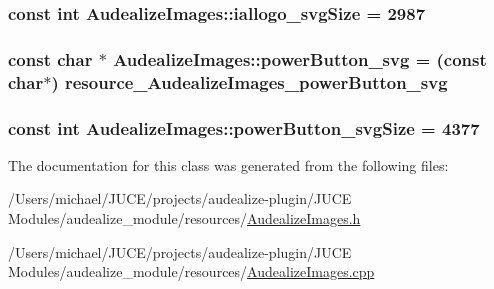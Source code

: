 \subsubsection[{\texorpdfstring{iallogo\+\_\+svg\+Size}{iallogo_svgSize}}]{\setlength{\rightskip}{0pt plus 5cm}const {\bf int} Audealize\+Images\+::iallogo\+\_\+svg\+Size = 2987\hspace{0.3cm}{\ttfamily [static]}}\hypertarget{class_audealize_1_1_audealize_images_a3216060c18fed8e493a28e3f39a020a1}{}\label{class_audealize_1_1_audealize_images_a3216060c18fed8e493a28e3f39a020a1}
\subsubsection[{\texorpdfstring{power\+Button\+\_\+svg}{powerButton_svg}}]{\setlength{\rightskip}{0pt plus 5cm}const char $\ast$ Audealize\+Images\+::power\+Button\+\_\+svg = (const char$\ast$) resource\+\_\+\+Audealize\+Images\+\_\+power\+Button\+\_\+svg\hspace{0.3cm}{\ttfamily [static]}}\hypertarget{class_audealize_1_1_audealize_images_a603300f72b88442487d1862ecc025337}{}\label{class_audealize_1_1_audealize_images_a603300f72b88442487d1862ecc025337}
\subsubsection[{\texorpdfstring{power\+Button\+\_\+svg\+Size}{powerButton_svgSize}}]{\setlength{\rightskip}{0pt plus 5cm}const {\bf int} Audealize\+Images\+::power\+Button\+\_\+svg\+Size = 4377\hspace{0.3cm}{\ttfamily [static]}}\hypertarget{class_audealize_1_1_audealize_images_afb26f9d7d3a8496bb571eea5b5de1077}{}\label{class_audealize_1_1_audealize_images_afb26f9d7d3a8496bb571eea5b5de1077}


The documentation for this class was generated from the following files\+:\begin{DoxyCompactItemize}
\item 
/\+Users/michael/\+J\+U\+C\+E/projects/audealize-\/plugin/\+J\+U\+C\+E Modules/audealize\+\_\+module/resources/\hyperlink{_audealize_images_8h}{Audealize\+Images.\+h}\item 
/\+Users/michael/\+J\+U\+C\+E/projects/audealize-\/plugin/\+J\+U\+C\+E Modules/audealize\+\_\+module/resources/\hyperlink{_audealize_images_8cpp}{Audealize\+Images.\+cpp}\end{DoxyCompactItemize}
